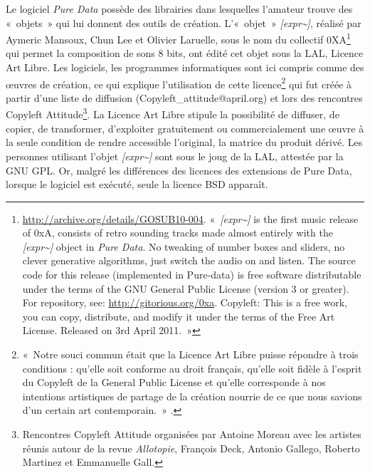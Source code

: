 \documentclass{FramateX}
\begin{document}
\begin{refsection}
Le logiciel \textit{Pure Data} possède des librairies dans lesquelles
l'amateur trouve des «~objets~» qui lui donnent des
outils de création. L'«~objet~» \textit{[expr\textasciitilde]}, réalisé
par Aymeric Mansoux, Chun Lee et Olivier Laruelle, sous le nom du
collectif 0XA\footnote{\url{http://archive.org/details/GOSUB10-004}. «~\textit{[expr\textasciitilde]} is the first music release of 0xA, consists of retro sounding tracks made almost entirely with the \textit{[expr\textasciitilde]} object in \textit{Pure Data}. No  tweaking of number boxes and sliders, no clever generative algorithms, just switch the audio on and listen. The source code for this release (implemented in Pure-data) is free software distributable under the terms of the GNU General Public License (version 3 or greater). For repository, see: \url{http://gitorious.org/0xa}. Copyleft: This is a free work, you can copy, distribute, and modify it under the terms of the Free Art License. Released on 3rd April 2011.~»} qui permet la composition de sons 8
bits, ont édité cet objet sous la LAL, Licence Art Libre. Les
logiciels, les programmes informatiques sont ici compris comme des
œuvres de création, ce qui explique l'utilisation de
cette licence\footnote{«~Notre souci commun était que la Licence Art
Libre puisse répondre à trois conditions : qu'elle
soit conforme au droit français, qu'elle soit fidèle à
l'esprit du Copyleft de la General Public License et qu'elle
corresponde à nos intentions artistiques de partage de la création
nourrie de ce que nous savions d'un certain art
contemporain.~» \cite[p.~478]{Moreau2001}.} qui fut créée à partir d'une liste de
diffusion (Copyleft\_attitude@april.org) et lors des
rencontres Copyleft Attitude\footnote{Rencontres Copyleft Attitude
organisées par Antoine Moreau avec les artistes réunis autour de la
revue \textit{Allotopie}, François Deck, Antonio Gallego, Roberto Martinez et
Emmanuelle Gall.}. La Licence Art Libre stipule la possibilité de
diffuser, de copier, de transformer, d'exploiter gratuitement ou
commercialement une œuvre à la seule condition de rendre accessible
l'original, la matrice du produit dérivé. Les personnes utilisant
l'objet \textit{[expr\textasciitilde]} sont sous le joug de la LAL, attestée par la GNU
GPL. Or, malgré les différences des licences des extensions de Pure
Data, lorsque le logiciel est exécuté, seule la licence BSD apparaît.


\end{refsection}
\end{document}

